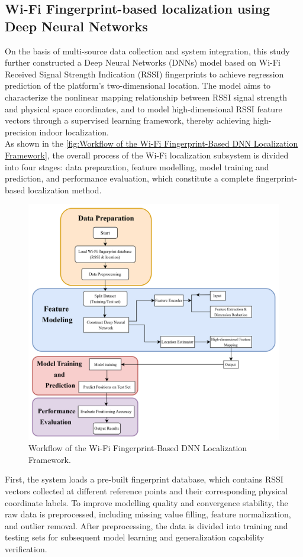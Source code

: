 \documentclass[12pt,a4paper]{article}
\numberwithin{equation}{section}
\begin{document}
\subsection{Wi-Fi Fingerprint-based localization using Deep Neural Networks }
On the basis of multi-source data collection and system integration, this study further constructed a Deep Neural Networks (DNNs) model based on Wi-Fi Received Signal Strength Indication (RSSI)  fingerprints to achieve regression prediction of the platform's two-dimensional location. The model aims to characterize the nonlinear mapping relationship between RSSI signal strength and physical space coordinates, and to model high-dimensional RSSI feature vectors through a supervised learning framework, thereby achieving high-precision indoor localization.\\
As shown in the \autoref{fig:Workflow of the Wi-Fi Fingerprint-Based DNN Localization Framework}, the overall process of the Wi-Fi localization subsystem is divided into four stages: data preparation, feature modelling, model training and prediction, and performance evaluation, which constitute a complete fingerprint-based localization method.
\begin{figure}[H]
    \centering
    \includegraphics[width=0.8\linewidth]{images/2.png}
    \caption{Workflow of the Wi-Fi Fingerprint-Based DNN Localization Framework.}
    \label{fig:Workflow of the Wi-Fi Fingerprint-Based DNN Localization Framework}
\end{figure}
\noindent First, the system loads a pre-built fingerprint database, which contains RSSI vectors collected at different reference points and their corresponding physical coordinate labels. To improve modelling quality and convergence stability, the raw data is preprocessed, including missing value filling, feature normalization, and outlier removal. After preprocessing, the data is divided into training and testing sets for subsequent model learning and generalization capability verification.\\
\end{document}
